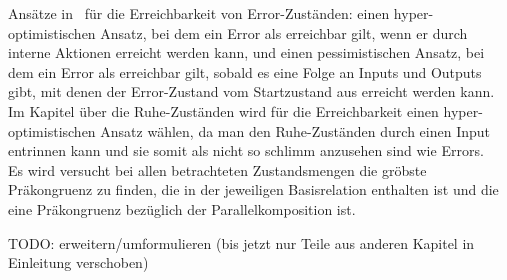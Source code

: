 Ansätze in~\cite{Vogler2014EIO} für die Erreichbarkeit von Error-Zuständen:
einen hyper-optimistischen Ansatz, bei dem ein Error als erreichbar gilt, wenn
er durch interne Aktionen erreicht werden kann, und einen pessimistischen
Ansatz, bei dem ein Error als erreichbar gilt, sobald es eine Folge an Inputs
und Outputs gibt, mit denen der Error-Zustand vom Startzustand aus erreicht
werden kann.\\
Im Kapitel über die Ruhe-Zuständen wird für die Erreichbarkeit einen
hyper-optimistischen Ansatz wählen, da man den Ruhe-Zuständen durch einen Input
entrinnen kann und sie somit als nicht so \glqq{}schlimm\grqq{} anzusehen sind
wie Errors.\\
Es wird versucht bei allen betrachteten Zustandsmengen die gröbste Präkongruenz zu
finden, die in der jeweiligen Basisrelation enthalten ist und die eine
Präkongruenz bezüglich der Parallelkomposition ist.

\scriptsize\textcolor{lgray}{TODO: erweitern/umformulieren (bis jetzt nur Teile
aus anderen Kapitel in Einleitung verschoben)}


\normalsize

